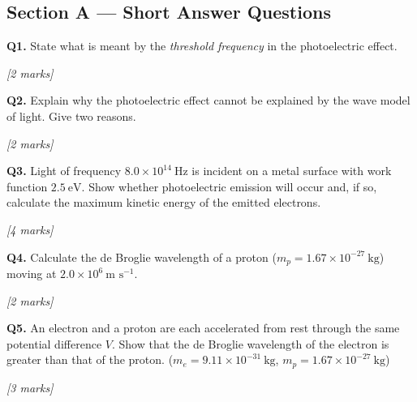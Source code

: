 \subsection*{Section A — Short Answer Questions}

\begin{tcolorbox}[colback=white, colframe=midblue, breakable]

\begin{minipage}{\linewidth}
\textbf{Q1.} State what is meant by the \emph{threshold frequency} in the photoelectric effect.
\par\hfill\textit{[2 marks]}
\vspace{2.5cm}
\end{minipage}

\begin{minipage}{\linewidth}
\textbf{Q2.} Explain why the photoelectric effect cannot be explained by the wave model of light. Give two reasons.
\par\hfill\textit{[2 marks]}
\vspace{3.0cm}
\end{minipage}

\begin{minipage}{\linewidth}
\textbf{Q3.} Light of frequency $8.0\times10^{14}\ \text{Hz}$ is incident on a metal surface with work function $2.5\ \text{eV}$. Show whether photoelectric emission will occur and, if so, calculate the maximum kinetic energy of the emitted electrons.
\par\hfill\textit{[4 marks]}
\vspace{4.0cm}
\end{minipage}

\begin{minipage}{\linewidth}
\textbf{Q4.} Calculate the de Broglie wavelength of a proton ($m_p = 1.67\times10^{-27}\ \text{kg}$) moving at $2.0\times10^6\ \text{m s}^{-1}$.
\par\hfill\textit{[2 marks]}
\vspace{3.0cm}
\end{minipage}

\begin{minipage}{\linewidth}
\textbf{Q5.} An electron and a proton are each accelerated from rest through the same potential difference $V$. Show that the de Broglie wavelength of the electron is greater than that of the proton. ($m_e = 9.11\times10^{-31}\ \text{kg}$, $m_p = 1.67\times10^{-27}\ \text{kg}$)
\par\hfill\textit{[3 marks]}
\vspace{3.5cm}
\end{minipage}

\end{tcolorbox}

